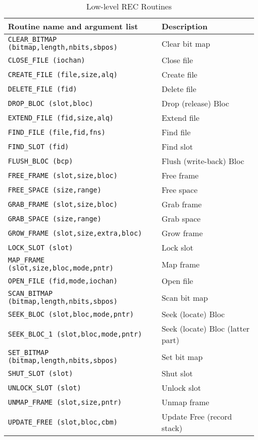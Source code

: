 \begin {table}[htbp]
\begin {center}
\begin {tabular}{||l|l||}
\hline
Routine name and argument list		& Description \\
\hline
{\tt CLEAR\_BITMAP (bitmap,length,nbits,sbpos)} & Clear bit map \\
{\tt CLOSE\_FILE (iochan)}		& Close file \\
{\tt CREATE\_FILE (file,size,alq)}	& Create file \\
{\tt DELETE\_FILE (fid)}		& Delete file \\
{\tt DROP\_BLOC (slot,bloc)}		& Drop (release) Bloc  \\
{\tt EXTEND\_FILE (fid,size,alq)}	& Extend file \\
{\tt FIND\_FILE (file,fid,fns)}		& Find file \\
{\tt FIND\_SLOT (fid)}			& Find slot \\
{\tt FLUSH\_BLOC (bcp)}			& Flush (write-back) Bloc \\
{\tt FREE\_FRAME (slot,size,bloc)}	& Free frame \\
{\tt FREE\_SPACE (size,range)}		& Free space \\
{\tt GRAB\_FRAME (slot,size,bloc)}	& Grab frame \\
{\tt GRAB\_SPACE (size,range)}		& Grab space \\
{\tt GROW\_FRAME (slot,size,extra,bloc)} & Grow frame \\
{\tt LOCK\_SLOT (slot)}			& Lock slot \\
{\tt MAP\_FRAME (slot,size,bloc,mode,pntr)} & Map frame \\
{\tt OPEN\_FILE (fid,mode,iochan)}	& Open file \\
{\tt SCAN\_BITMAP (bitmap,length,nbits,sbpos)} & Scan bit map \\
{\tt SEEK\_BLOC (slot,bloc,mode,pntr)} & Seek (locate) Bloc \\
{\tt SEEK\_BLOC\_1 (slot,bloc,mode,pntr)} & Seek (locate) Bloc (latter part) \\
{\tt SET\_BITMAP (bitmap,length,nbits,sbpos)} & Set bit map \\
{\tt SHUT\_SLOT (slot)}			& Shut slot \\
{\tt UNLOCK\_SLOT (slot)}		& Unlock slot \\
{\tt UNMAP\_FRAME (slot,size,pntr)}	& Unmap frame \\
{\tt UPDATE\_FREE (slot,bloc,cbm)}	& Update Free (record stack) \\
\hline
\end {tabular}
\caption {Low-level REC Routines}
\label {low_level_rec_routines}
\end {center}
\end {table}

